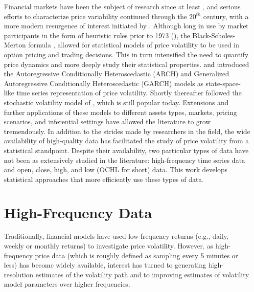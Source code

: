 \label{ch:introduction}

Financial markets have been the subject of research since at least
\cite{bachelier1900theorie}, and serious efforts to characterize price
variability continued through the $20^{th}$ century, with a more
modern resurgence of interest initiated by
\cite{mandelbrot1967variation}. Although long in use by market
participants in the form of heuristic rules prior to 1973
(\cite{haug2011option}), the Black-Scholes-Merton formula
\cite{black1973pricing}, \cite{merton1973theory} allowed for
statistical models of price volatility to be used in option pricing
and trading decisions. This in turn intensified the need to quantify
price dynamics and more deeply study their statistical
properties. \cite{engle1982} and \cite{bollerslev1986} introduced the
Autoregressive Conditionally Heteroscedastic (ARCH) and Generalized
Autoregressive Conditionally Heteroscedastic (GARCH) models as
state-space-like time series representation of price
volatility. Shortly thereafter followed the stochastic volatility
model of \cite{hull1987pricing}, which is still popular
today. Extensions and further applications of these models to
different assets types, markets, pricing scenarios, and inferential
settings have allowed the literature to grow tremendously. In addition
to the strides made by researchers in the field, the wide availability
of high-quality data has facilitated the study of price volatility
from a statistical standpoint. Despite their availability, two
particular types of data have not been as extensively studied in the
literature: high-frequency time series data and open, close, high, and
low (OCHL for short) data. This work develops statistical approaches
that more efficiently use these types of data.

\section{High-Frequency Data}
Traditionally, financial models have used low-frequency returns (e.g.,
daily, weekly or monthly returns) to investigate price
volatility. However, as high-frequency price data (which is roughly
defined as sampling every 5 minutes or less) has become widely
available, interest has turned to generating high-resolution estimates
of the volatility path and to improving estimates of volatility model
parameters over higher frequencies.


